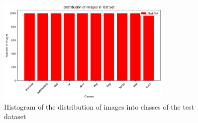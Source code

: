 \documentclass[a4paper]{article}
\begin{document}
\begin{enumerate}
    \begin{figure}[h]
        \centering
        \includegraphics[width=0.75\textwidth]{images/testHG.png}
        \caption{Histogram of the distribution of images into classes of the test dataset}
        \label{fig:testHG}
    \end{figure}


\end{enumerate}
\end{document}
